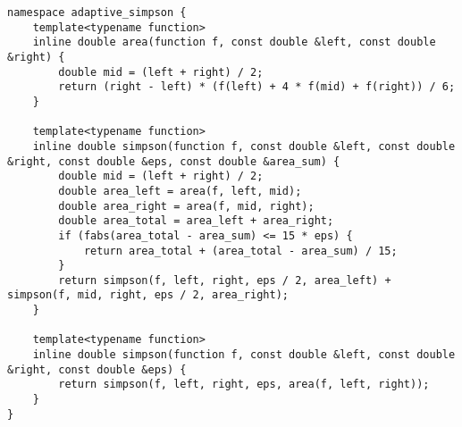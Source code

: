 \begin{lstlisting}
namespace adaptive_simpson {
	template<typename function>
	inline double area(function f, const double &left, const double &right) {
		double mid = (left + right) / 2;
		return (right - left) * (f(left) + 4 * f(mid) + f(right)) / 6;
	}
	
	template<typename function>
	inline double simpson(function f, const double &left, const double &right, const double &eps, const double &area_sum) {
		double mid = (left + right) / 2;
		double area_left = area(f, left, mid);
		double area_right = area(f, mid, right);
		double area_total = area_left + area_right;
		if (fabs(area_total - area_sum) <= 15 * eps) {
			return area_total + (area_total - area_sum) / 15;
		}
		return simpson(f, left, right, eps / 2, area_left) + simpson(f, mid, right, eps / 2, area_right);
	}
	
	template<typename function>
	inline double simpson(function f, const double &left, const double &right, const double &eps) {
		return simpson(f, left, right, eps, area(f, left, right));
	}
}
\end{lstlisting}
